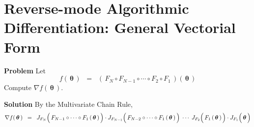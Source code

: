 

\section{Reverse-mode Algorithmic Differentiation: General Vectorial Form}
\setcounter{theorem}{0}
\setcounter{equation}{0}


\renewcommand{\theenumi}{\roman{enumi}}
\renewcommand{\labelenumi}{\textnormal{(\theenumi)}$\;\;$}


\noindent
\textbf{Problem}
\vskip 0.2cm
\noindent
Let
\begin{equation*}
f\!\left(\,\bm{\theta}\,\right)
\;\; = \;\;
	\left(\,F_{N} \circ F_{N-1} \circ \cdots \circ F_{2} \circ F_{1}\,\right)\left(\,\bm{\theta}\,\right)
\end{equation*}
Compute \;$\nabla f\!\left(\,\bm{\theta}\,\right)$.

\vskip 0.5cm
\noindent
\textbf{Solution}
\vskip 0.2cm
\noindent
By the Multivariate Chain Rule,
\begin{equation*}
\nabla f\!\left(\,\bm{\theta}\,\right)
\;\; = \;\;
	J_{F_{N}}\!\left(\,F_{N-1} \circ \cdots \circ F_{1}\,(\,\overset{{\color{white}.}}{\bm{\theta}}\,)\,\right)
	\cdot
	J_{F_{N-1}}\!\left(\,F_{N-2} \circ \cdots \circ F_{1}\,(\,\overset{{\color{white}.}}{\bm{\theta}}\,)\,\right)
	\;\cdots\;
	J_{F_{2}}\!\left(\,F_{1}\,(\,\overset{{\color{white}.}}{\bm{\theta}}\,)\,\right)
	\cdot
	J_{F_{1}}\!\left(\,\overset{{\color{white}.}}{\bm{\theta}}\,\right)
\end{equation*}

